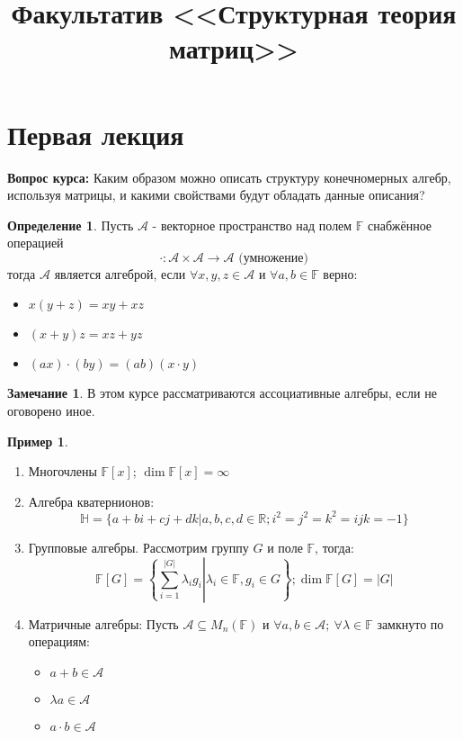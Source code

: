 \documentclass[a4paper, 14pt]{extarticle}
\title{Факультатив <<Структурная теория матриц>>}
\theoremstyle{definition}
\newtheorem{definition}{Определение}
\newtheorem{note}{Замечание}
\newtheorem{example}{Пример}
\begin{document}
\pagestyle{fancy}
\maketitle

\newpage
\tableofcontents

\newpage

\section{Первая лекция}

\textbf{Вопрос курса:} Каким образом можно описать структуру конечномерных алгебр, используя матрицы, и какими свойствами будут обладать данные описания?
\begin{definition}
	 Пусть \(\mathcal{A}\) - векторное пространство над полем \(\mathbb{F}\) снабжённое операцией \[\cdot : \mathcal{A} \times \mathcal{A} \rightarrow \mathcal{A} \text{ (умножение)}\]
	 тогда \(\mathcal{A}\) является алгеброй, если \(\forall x, y, z \in \mathcal{A}\) и \(\forall a, b \in \mathbb{F}\) верно:
	 \begin{itemize}
	 	\item \(x(y + z) = xy + xz\)
	 	\item \((x + y)z = xz + yz\)
	 	\item \((ax) \cdot (by) = (ab)(x \cdot y)\)
	 \end{itemize}
\end{definition}

\begin{note}
	В этом курсе рассматриваются ассоциативные алгебры, если не оговорено иное.
\end{note}

\begin{example}
	\leavevmode
	\begin{enumerate}
		\item Многочлены \(\mathbb{F}[x]\); \(\operatorname{dim}\mathbb{F}[x] = \infty\)
		\item Алгебра кватернионов: \[\mathbb{H} = \{a + bi + cj + dk | a, b, c, d \in \mathbb{R}; i^2 = j^2 = k^2 = ijk = -1\}\]
		\item Групповые алгебры. Рассмотрим группу \(G\) и поле \(\mathbb{F}\), тогда: \[\mathbb{F}[G]= \left\{\sum\limits_{i = 1}^{|G|} \lambda_i g_i \left|\right. \lambda_i \in \mathbb{F}, g_i \in G \right\}; \operatorname{dim} \mathbb{F}[G] = |G|\]
		\item Матричные алгебры: Пусть \(\mathcal{A} \subseteq M_n(\mathbb{F})\) и \(\forall a, b \in \mathcal{A};\ \forall \lambda \in \mathbb{F}\) замкнуто по операциям:
		\begin{itemize}
			\item \(a + b \in \mathcal{A}\)
			\item \(\lambda a \in \mathcal{A}\)
			\item \(a \cdot b \in \mathcal{A}\)
		\end{itemize}
	\end{enumerate}
\end{example}
\end{document}
